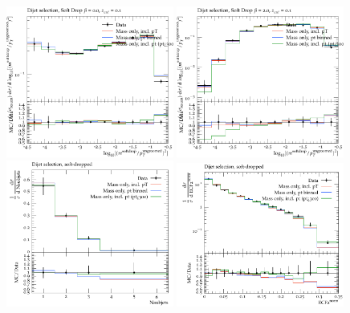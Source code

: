 \begin{figure}
\begin{center}
\includegraphics[width=0.49\textwidth]{figs/RivetPlotsMassOnly/SoftDropMass/d01-x01-y01.pdf} \hfill
\includegraphics[width=0.49\textwidth]{figs/RivetPlotsMassOnly/SoftDropMass/d03-x01-y01.pdf} \hfill
\includegraphics[width=0.49\textwidth]{figs/RivetPlotsMassOnly/ATLAS_2019_I1724098/d23-x01-y01.pdf} \hfill
\includegraphics[width=0.49\textwidth]{figs/RivetPlotsMassOnly/ATLAS_2019_I1724098/d27-x01-y01.pdf} \hfill
\end{center}
\label{massOnlyTune}
\end{figure}

